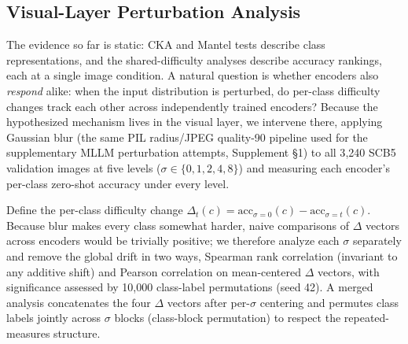 \documentclass[a4paper,fleqn]{cas-sc}
\begin{document}
\subsection{Visual-Layer Perturbation Analysis}
\label{sec:perturbation_visual}

The evidence so far is static: CKA and Mantel tests describe class representations, and the shared-difficulty analyses describe accuracy rankings, each at a single image condition. A natural question is whether encoders also \emph{respond} alike: when the input distribution is perturbed, do per-class difficulty changes track each other across independently trained encoders? Because the hypothesized mechanism lives in the visual layer, we intervene there, applying Gaussian blur (the same PIL radius/JPEG quality-90 pipeline used for the supplementary MLLM perturbation attempts, Supplement \S1) to all 3{,}240 SCB5 validation images at five levels ($\sigma \in \{0,1,2,4,8\}$) and measuring each encoder's per-class zero-shot accuracy under every level.

Define the per-class difficulty change $\Delta_t(c) = \mathrm{acc}_{\sigma=0}(c) - \mathrm{acc}_{\sigma=t}(c)$. Because blur makes every class somewhat harder, naive comparisons of $\Delta$ vectors across encoders would be trivially positive; we therefore analyze each $\sigma$ separately and remove the global drift in two ways, Spearman rank correlation (invariant to any additive shift) and Pearson correlation on mean-centered $\Delta$ vectors, with significance assessed by 10{,}000 class-label permutations (seed 42). A merged analysis concatenates the four $\Delta$ vectors after per-$\sigma$ centering and permutes class labels jointly across $\sigma$ blocks (class-block permutation) to respect the repeated-measures structure.
\end{document}
